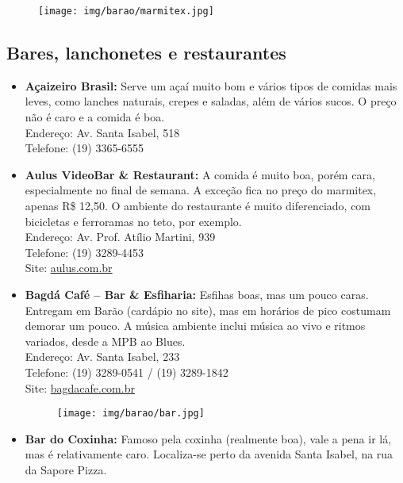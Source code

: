 \begin{figure}[h!]
    \centering
    \texttt{[image: img/barao/marmitex.jpg]}
\end{figure}

\subsection{Bares, lanchonetes e restaurantes}

\begin{itemize}
    \item   \textbf{Açaizeiro Brasil:} Serve um açaí muito bom e vários tipos de
        comidas mais leves, como lanches naturais, crepes e saladas, além de
        vários sucos. O preço não é caro e a comida é boa.
        \\Endereço: Av. Santa Isabel, 518
        \\Telefone: (19) 3365-6555 %

    \item   \textbf{Aulus VideoBar \& Restaurant:} A comida é muito boa, porém
        cara, especialmente no final de semana. A exceção fica no preço do
        marmitex, apenas R\$ 12,50. O ambiente do restaurante é muito diferenciado,
        com bicicletas e ferroramas no teto, por exemplo.
        \\Endereço: Av. Prof. Atílio Martini, 939
        \\Telefone: (19) 3289-4453
        \\Site: \url{aulus.com.br}

    \item   \textbf{Bagdá Café -- Bar \& Esfiharia:} Esfihas boas, mas um pouco
        caras. Entregam em Barão (cardápio no site), mas em horários de pico
        costumam demorar um pouco. A música ambiente inclui música ao vivo e
        ritmos variados, desde a MPB ao Blues.
        \\Endereço: Av. Santa Isabel, 233
        \\Telefone: (19) 3289-0541 / (19) 3289-1842
        \\Site: \url{bagdacafe.com.br}

\begin{figure}[h!]
    \centering
    \texttt{[image: img/barao/bar.jpg]}
\end{figure}

    \item   \textbf{Bar do Coxinha:} Famoso pela coxinha (realmente boa), vale a
        pena ir lá, mas é relativamente caro. Localiza-se perto da avenida Santa
        Isabel, na rua da Sapore Pizza.


\end{itemize}
